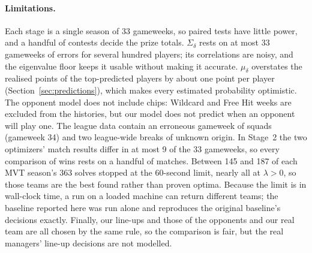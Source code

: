 \paragraph{Limitations.} Each stage is a single season of 33 gameweeks, so paired tests have
little power, and a handful of contests decide the prize totals. $\Sigma_\delta$ rests on at
most 33 gameweeks of errors for several hundred players; its correlations are noisy, and the
eigenvalue floor keeps it usable without making it accurate. $\mu_\delta$ overstates the
realised points of the top-predicted players by about one point per player
(Section~\ref{sec:predictions}), which makes every estimated probability optimistic. The
opponent model does not include chips: Wildcard and Free Hit weeks are excluded from the
histories, but our model does not predict when an opponent will play one. The league data
contain an erroneous gameweek of squads (gameweek 34) and two league-wide breaks of unknown
origin. In Stage~2 the two optimizers' match results differ in at most 9 of the 33 gameweeks,
so every comparison of wins rests on a handful of matches. Between 145 and 187 of each MVT
season's 363 solves stopped at the 60-second limit, nearly all at $\lambda>0$, so those teams
are the best found rather than proven optima. Because the limit is in wall-clock time, a run on a loaded machine can return
different teams; the baseline reported here was run alone and reproduces the original
baseline's decisions exactly. Finally, our line-ups and those of the opponents and our real
team are all chosen by the same rule, so the comparison is fair, but the real managers'
line-up decisions are not modelled.
